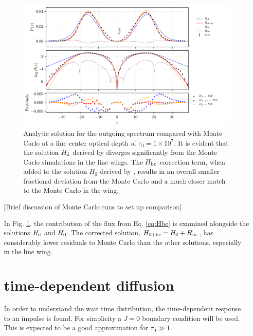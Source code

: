 \documentclass{aastex63}
\begin{document}
\begin{figure}
    \centering
    \includegraphics{pdf_xinit0.0.pdf}
    \caption{Analytic solution for the outgoing spectrum compared with Monte Carlo at a line center optical depth of $\tau_0 = 1 \times 10^7$. It is evident that the solution $H_{\rm d}$ derived by \citet{1973MNRAS.162...43H} diverges significantly from the Monte Carlo simulations in the line wings. The $H_{\rm bc}$ correction term, when added to the solution $H_0$ derived by \citet{2006ApJ...649...14D}, results in an overall smaller fractional deviation from the Monte Carlo and a much closer match to the Monte Carlo in the wing.}
    \label{fig:sol_mc_residual}
\end{figure}

[Brief discussion of Monte Carlo runs to set up comparison]

In Fig. \ref{fig:sol_mc_residual}, the contribution of the flux from Eq. \ref{eq:Hbc} is examined alongside the solutions $H_{\rm d}$ and $H_{\rm 0}$. The corrected solution, $H_{\rm 0 + bc} = H_{\rm 0} + H_{\rm bc}$, has considerably lower residuals to Monte Carlo than the other solutions, especially in the line wing.

\section{ time-dependent diffusion }

In order to understand the wait time distribution, the time-dependent response to an impulse is found. For simplicity a $J=0$ boundary condition will be used. This is expected to be a good approximation for $\tau_0 \gg 1$. 
\end{document}
